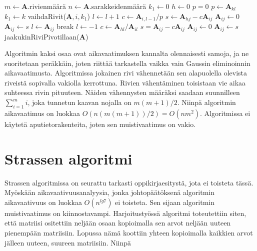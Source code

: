\documentclass[a4paper]{article}
\begin{document}
\begin{algorithmic}[1]
\State $m \gets \textbf{A}$.rivienmäärä
\State $n \gets \textbf{A}$.sarakkeidenmäärä
\State $k_1 \gets 0$
\State $h\gets0$
	\State $p=0$
				\State $p \gets \textbf{A}_{k l}$ 	
				\State $k_1 \gets k$
			\EndIf
		\EndFor
	\EndWhile
	\State vaihdaRivit($\textbf{A},i,k_1$)
	\State $l\gets l+1$
		\State $c \gets \textbf{A}_{i, l-1}/p$
			\State $s \gets \textbf{A}_{h j}-c\textbf{A}_{i j}$
				\State $\textbf{A}_{i j} \gets 0$
			\Else
				\State $\textbf{A}_{i j} \gets s$
			\EndIf
		\EndFor
	\EndFor
\EndFor
{}
			\State $l \gets \textbf{A}_{i j}$
			\State break
		\Else
			\State $l \gets -1$
		\EndIf
	\EndFor
			\State $c\gets \textbf{A}_{h l}/\textbf{A}_{i l}$
				\State $s = \textbf{A}_{i j}-c\textbf{A}_{i j}$
					\State $\textbf{A}_{i j} \gets 0$
				\Else
					\State $\textbf{A}_{i j} \gets s$
				\EndIf
			\EndFor
		\EndFor
	\EndIf
\EndFor
\State jaakukinRiviPivotillaan(\textbf{A})
\EndProcedure
\end{algorithmic}
Algoritmin kaksi osaa ovat aikavaatimuksen kannalta olennaisesti samoja, ja ne suoritetaan peräkkäin, joten riittää tarkastella vaikka vain Gaussin eliminoinnin aikavaatimusta. Algoritmissa jokainen rivi vähennetään sen alapuolella olevista riveistä sopivalla vakiolla kerrottuna. Rivien vähentäminen toisistaan vie aikaa suhteessa rivin pituuteen. Näiden vähennysten määräksi saadaan suunnilleen $\sum_{i=1}^{m}i$, joka tunnetun kaavan nojalla on $m(m+1)/2$. Niinpä algoritmin aikavaatimus on luokkaa $O(n(m(m+1))/2)=O(nm^2)$. Algoritmissa ei käytetä aputietorakenteita, joten sen muistivaatimus on vakio.

\section*{Strassen algoritmi}
Strassen algoritmissa on seurattu tarkasti oppikirjaesitystä\cite[s.~99]{cormen}, jota ei toisteta tässä. Myöskään aikavaativuusanalyysia, jonka johtopäätöksenä algoritmin aikavaativuus on luokkaa $O(n^{lg7})$ ei toisteta. Sen sijaan algoritmin muistivaatimus on kiinnostavampi. Harjoitustyössä algoritmi toteutettiin siten, että matriisi ositettiin neljään osaan kopioimalla sen arvot neljään uuteen pienempään matriisiin. Lopussa nämä koottiin yhteen kopioimalla kaikkien arvot jälleen uuteen, suureen matriisiin. Niinpä 



\end{document}
